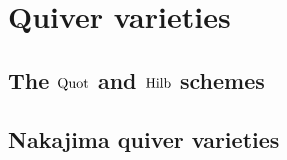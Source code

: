 \section{Quiver varieties}
    \subsection{The \texorpdfstring{$\mathrm{Quot}$}{} and \texorpdfstring{$\mathrm{Hilb}$}{} schemes}
    
    \subsection{Nakajima quiver varieties}